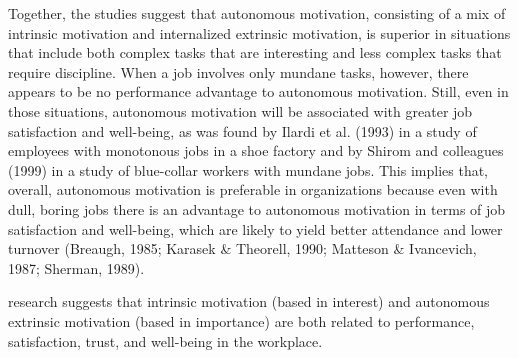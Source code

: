 Together, the studies suggest that autonomous motivation, consisting of a mix of intrinsic motivation and internalized extrinsic motivation, is superior in situations that include both complex tasks that are interesting and less complex tasks that require discipline. When a job involves only mundane tasks, however, there appears to be no performance advantage to autonomous motivation. Still, even in those situations, autonomous motivation will be associated with greater job satisfaction and well-being, as was found by Ilardi et al. (1993) in a study of employees with monotonous jobs in a shoe factory and by Shirom and colleagues (1999) in a study of blue-collar workers with mundane jobs. This implies that, overall, autonomous motivation is preferable in organizations because even with dull, boring jobs there is an advantage to autonomous motivation in terms of job satisfaction and well-being, which are likely to yield better attendance and lower turnover (Breaugh, 1985; Karasek & Theorell, 1990; Matteson & Ivancevich, 1987; Sherman, 1989).

research suggests that intrinsic motivation (based in interest) and autonomous extrinsic motivation (based in importance) are both related to performance, satisfaction, trust, and well-being in the workplace.